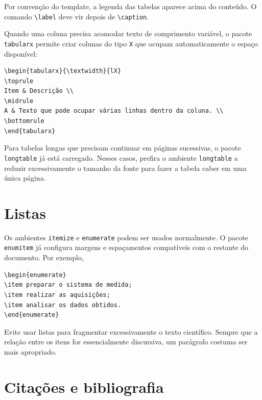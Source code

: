 Por convenção do template, a legenda das tabelas aparece acima do conteúdo. O comando \verb|\label| deve vir depois de \verb|\caption|.

Quando uma coluna precisa acomodar texto de comprimento variável, o pacote \verb|tabularx| permite criar colunas do tipo \verb|X| que ocupam automaticamente o espaço disponível:

\begin{verbatim}
\begin{tabularx}{\textwidth}{lX}
\toprule
Item & Descrição \\
\midrule
A & Texto que pode ocupar várias linhas dentro da coluna. \\
\bottomrule
\end{tabularx}
\end{verbatim}

Para tabelas longas que precisam continuar em páginas sucessivas, o pacote \verb|longtable| já está carregado. Nesses casos, prefira o ambiente \verb|longtable| a reduzir excessivamente o tamanho da fonte para fazer a tabela caber em uma única página.

\section{Listas}
\label{sec:listas}

Os ambientes \verb|itemize| e \verb|enumerate| podem ser usados normalmente. O pacote \verb|enumitem| já configura margens e espaçamentos compatíveis com o restante do documento. Por exemplo,

\begin{verbatim}
\begin{enumerate}
\item preparar o sistema de medida;
\item realizar as aquisições;
\item analisar os dados obtidos.
\end{enumerate}
\end{verbatim}

Evite usar listas para fragmentar excessivamente o texto científico. Sempre que a relação entre os itens for essencialmente discursiva, um parágrafo costuma ser mais apropriado.

\section{Citações e bibliografia}
\label{sec:citacoes_bibliografia}


